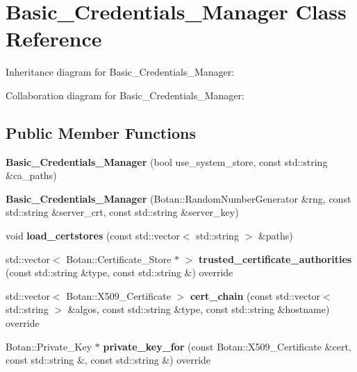 \hypertarget{class_basic___credentials___manager}{}\section{Basic\+\_\+\+Credentials\+\_\+\+Manager Class Reference}
\label{class_basic___credentials___manager}


Inheritance diagram for Basic\+\_\+\+Credentials\+\_\+\+Manager\+:


Collaboration diagram for Basic\+\_\+\+Credentials\+\_\+\+Manager\+:
\subsection*{Public Member Functions}
\begin{DoxyCompactItemize}
\item 
\mbox{\label{class_basic___credentials___manager_aca52a3449dc5fd518e165066a3851c1f}} 
{\bfseries Basic\+\_\+\+Credentials\+\_\+\+Manager} (bool use\+\_\+system\+\_\+store, const std\+::string \&ca\+\_\+paths)
\item 
\mbox{\label{class_basic___credentials___manager_a7290d3b3e666cc22458dc36a6f968847}} 
{\bfseries Basic\+\_\+\+Credentials\+\_\+\+Manager} (Botan\+::\+Random\+Number\+Generator \&rng, const std\+::string \&server\+\_\+crt, const std\+::string \&server\+\_\+key)
\item 
\mbox{\label{class_basic___credentials___manager_afb35712f1fafebb4c4d4d0641164ad21}} 
void {\bfseries load\+\_\+certstores} (const std\+::vector$<$ std\+::string $>$ \&paths)
\item 
\mbox{\label{class_basic___credentials___manager_a5d01b9c3c03517a653be020034845394}} 
std\+::vector$<$ Botan\+::\+Certificate\+\_\+\+Store $\ast$ $>$ {\bfseries trusted\+\_\+certificate\+\_\+authorities} (const std\+::string \&type, const std\+::string \&) override
\item 
\mbox{\label{class_basic___credentials___manager_a7ccf5b39e2d284003097ac2eb358e05a}} 
std\+::vector$<$ Botan\+::\+X509\+\_\+\+Certificate $>$ {\bfseries cert\+\_\+chain} (const std\+::vector$<$ std\+::string $>$ \&algos, const std\+::string \&type, const std\+::string \&hostname) override
\item 
\mbox{\label{class_basic___credentials___manager_a562342340c97ea38aefa74e8c85cff2e}} 
Botan\+::\+Private\+\_\+\+Key $\ast$ {\bfseries private\+\_\+key\+\_\+for} (const Botan\+::\+X509\+\_\+\+Certificate \&cert, const std\+::string \&, const std\+::string \&) override
\end{DoxyCompactItemize}


